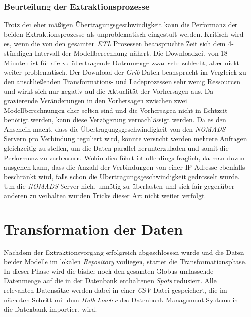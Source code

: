 \subsubsection{Beurteilung der Extraktionsprozesse}
Trotz der eher mäßigen Übertragungsgeschwindigkeit kann die Performanz
der beiden Extraktionsprozesse als unproblematisch eingestuft
werden. Kritisch wird es, wenn die von den gesamten \textit{ETL}
Prozessen beanspruchte Zeit sich dem 4-stündigen Intervall der
Modellberechnung nähert. Die Downloadzeit von 18 Minuten ist für die
zu übertragende Datenmenge zwar sehr schlecht, aber nicht weiter
problematisch. Der Download der \textit{Grib}-Daten beansprucht im
Vergleich zu den anschließenden Transformations- und Ladeprozessen
sehr wenig Ressourcen und wirkt sich nur negativ auf die Aktualität
der Vorhersagen aus. Da gravierende Veränderungen in den Vorhersagen
zwischen zwei Modellberechnungen eher selten sind und die Vorhersagen
nicht in Echtzeit benötigt werden, kann diese Verzögerung
vernachlässigt werden. Da es den Anschein macht, dass die
Übertragungsgeschwindigkeit von den \textit{NOMADS} Servern pro
Verbindung reguliert wird, könnte versucht werden mehrere Anfragen
gleichzeitig zu stellen, um die Daten parallel herunterzuladen und
somit die Performanz zu verbessern. Wohin dies führt ist allerdings
fraglich, da man davon ausgehen kann, dass die Anzahl der Verbindungen
von einer IP Adresse ebenfalls beschränkt wird, falls schon die
Übertragungsgeschwindigkeit gedrosselt wurde. Um die \textit{NOMADS}
Server nicht unnötig zu überlasten und sich fair gegenüber anderen zu
verhalten wurden Tricks dieser Art nicht weiter verfolgt.

\section{Transformation der Daten}
Nachdem der Extraktionsvorgang erfolgreich abgeschlossen wurde und
die Daten beider Modelle im lokalen \textit{Repository} vorliegen,
startet die Transformationsphase. In dieser Phase wird die bisher noch
den gesamten Globus umfassende Datenmenge auf die in der Datenbank
enthaltenen \textit{Spots} reduziert. Alle relevanten Datensätze
werden dabei in einer \textit{CSV}  Datei gespeichert, die im nächsten Schritt mit dem
\textit{Bulk Loader} des Datenbank Management Systems in die Datenbank
importiert wird.

